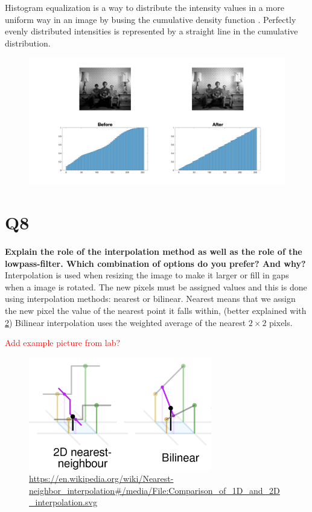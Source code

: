 \documentclass[oneside,a4paper]{article}
\begin{document}
Histogram equalization is a way to distribute the intensity values in a more uniform way in an image by busing the cumulative density function . Perfectly evenly distributed intensities is represented by a straight line in the cumulative distribution. 

\begin{figure}[ht!]
\centering
\includegraphics[width=120mm]{figures/Q11b.png}
\caption{}
\label{fig:Q11b}
\end{figure}


\section*{Q8}
\textbf{Explain the role of the interpolation method as well as the role of the lowpass-filter. Which combination of options do you prefer? And why?}
Interpolation is used when resizing the image to make it larger or fill in gaps when a image is rotated. The new pixels must be assigned values and this is done using interpolation methods: nearest or bilinear. Nearest means that we assign the new pixel the value of the nearest point it falls within, (better explained with \ref{fig:bilinear})
Bilinear interpolation uses the weighted average of the nearest $2 \times 2$ pixels.   

\textcolor{red}{Add example picture from lab?}

\begin{figure}[ht!]
\centering
\includegraphics[width=80mm]{figures/Nearest_bilinear.png}
\caption{\url{https://en.wikipedia.org/wiki/Nearest-neighbor_interpolation\#/media/File:Comparison_of_1D_and_2D_interpolation.svg}}
\label{fig:bilinear}
\end{figure}
\end{document}
